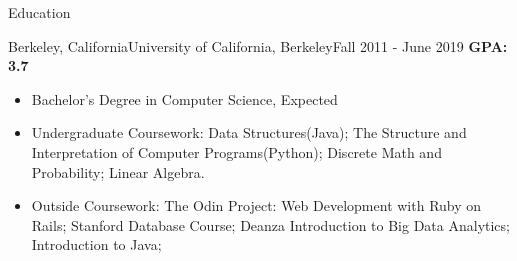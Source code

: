 \documentclass[]{mcdowellcv}
\begin{document}
	\makeheader
	
	\begin{cvsection}{Education}
		\begin{cvsubsection}{Berkeley, California}{University of California, Berkeley}{Fall 2011 - June 2019}
			\textbf{GPA: 3.7}			
			\begin{itemize}
				\item Bachelor's Degree in Computer Science, Expected
				\item Undergraduate Coursework: Data Structures(Java); The Structure and Interpretation of Computer Programs(Python); Discrete Math and Probability; Linear Algebra.
				\item Outside Coursework: The Odin Project: Web Development with Ruby on Rails; Stanford Database Course; Deanza Introduction to Big Data Analytics; Introduction to Java; 
			\end{itemize}
		\end{cvsubsection}
	\end{cvsection}
	
\end{document}

